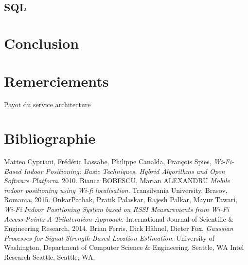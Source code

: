 \documentclass[11pt,a4paper]{article}
\begin{document}
  \subsection{SQL}

\section{Conclusion}

\section{Remerciements}
  Payot du service architecture

\section{Bibliographie}
  \begin{thebibliography}{9}
      Matteo Cypriani, Frédéric Lassabe, Philippe Canalda, François Spies,
      \emph{Wi-Fi-Based Indoor Positioning: Basic Techniques, Hybrid Algorithms and Open Software Platform}.
      2010.
      Bianca BOBESCU, Marian ALEXANDRU
      \emph{Mobile indoor positioning using Wi-fi localisation}.
      Transilvania University, Brasov, Romania,
      2015.
      OnkarPathak, Pratik Palaskar, Rajesh Palkar, Mayur Tawari,
      \emph{Wi-Fi Indoor Positioning System based on RSSI Measurements from Wi-Fi Access Points A Trilateration Approach}.
      International Journal of Scientific \& Engineering Research,
      2014.
      Brian Ferris, Dirk Hähnel, Dieter Fox,
      \emph{Gaussian Processes for Signal Strength-Based Location Estimation}.
      University of Washington, Department of Computer Science \& Engineering, Seattle, WA Intel Research Seattle, Seattle, WA.
  \end{thebibliography}
\end{document}

